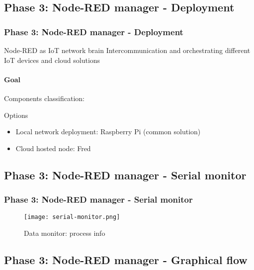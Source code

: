 \documentclass[
    aspectratio=169,                   %
]{beamer}
\begin{document}
\subsection{Phase 3: Node-RED manager - Deployment}

    \begin{frame}
        \frametitle{Phase 3: Node-RED manager - Deployment}

        \begin{block}{Node-RED as IoT network brain}
            Intercommunication and orchestrating different IoT devices and cloud solutions
        \end{block}

        \paragraph{Goal} Components classification:

        \begin{block}{Options}
            \begin{itemize}
                \item \alert{Local network deployment}: Raspberry Pi (common solution)
                \item \alert{Cloud hosted node}: Fred
            \end{itemize}
        \end{block}

    \end{frame}

\subsection{Phase 3: Node-RED manager - Serial monitor}

    \begin{frame}
        \frametitle{Phase 3: Node-RED manager - Serial monitor}

        \begin{figure}
            \centering
            \begin{stampbox}
                \texttt{[image: serial-monitor.png]}
            \end{stampbox}
            \caption{Data monitor: process info}
        \end{figure}

    \end{frame}


\subsection{Phase 3: Node-RED manager - Graphical flow}
\end{document}
